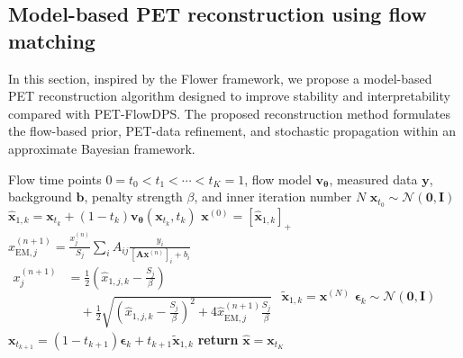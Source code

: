 \documentclass[journal]{IEEEtran}
\begin{document}
\subsection{Model-based PET reconstruction using flow matching} 
In this section, inspired by the Flower framework, we propose a model-based PET reconstruction algorithm designed to improve stability and interpretability compared with PET-FlowDPS. The proposed reconstruction method formulates the flow-based prior, PET-data refinement, and stochastic propagation within an approximate Bayesian framework.


\begin{algorithm}[!t]
  \caption{Model-based PET reconstruction using flow matching}
  \label{alg:petflower}
  \begin{algorithmic}[1]
    \REQUIRE Flow time points $0=t_0<t_1<\cdots<t_K=1$, flow model $\bm{v}_{\bm{\theta}}$, measured data $\bm{y}$, background $\bm{b}$, penalty strength $\beta$, and inner iteration number $N$
    \STATE $\bm{x}_{t_0}\sim\mathcal{N}(\bm{0},\bm{I})$
        \STATE $\hat{\bm{x}}_{1,k} = \bm{x}_{t_k} + (1-t_k)\bm{v}_{\bm{\theta}}(\bm{x}_{t_k},t_k)$
        \STATE $\bm{x}^{(0)} = [\hat{\bm{x}}_{1,k}]_{+}$
            \STATE $\hat x^{(n+1)}_{\mathrm{EM},j} = \frac{x_j^{(n)}}{S_j} \sum_{i} A_{ij}\frac{y_i}{[\bm{A}\bm{x}^{(n)}]_i+b_i}$
            \STATE $\begin{aligned}
            x_j^{(n+1)}
            &=
            \frac{1}{2}
            \left(
            \hat{x}_{1,j,k}
            -
            \frac{S_j}{\beta}
            \right)
            \\
            &\quad+
            \frac{1}{2}
            \sqrt{
            \left(
            \hat{x}_{1,j,k}
            -
            \frac{S_j}{\beta}
            \right)^2
            +
            4\hat{x}_{\mathrm{EM},j}^{(n+1)}
            \frac{S_j}{\beta}
            }
            \end{aligned}$
        \ENDFOR
        \STATE $\tilde{\bm{x}}_{1,k} = \bm{x}^{(N)}$
        \STATE $\bm{\epsilon}_k \sim\mathcal{N}(\bm{0},\bm{I})$
        \STATE $\bm{x}_{t_{k+1}} = (1-t_{k+1})\bm{\epsilon}_k + t_{k+1}\tilde{\bm{x}}_{1,k}$
    \ENDFOR
    \STATE \textbf{return} $\hat{\bm{x}}=\bm{x}_{t_K}$
  \end{algorithmic}
\end{algorithm}
\end{document}
